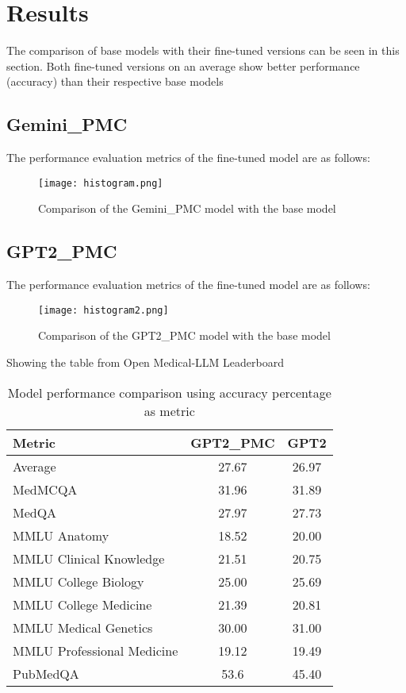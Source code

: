 \chapter{Results}
\label{C4} %
\clearpage
The comparison of base models with their fine-tuned versions can be seen in this section. Both fine-tuned versions on an average show better performance (accuracy) than their respective base models


\section{Gemini\_PMC}
The performance evaluation metrics of the fine-tuned model are as follows:
\begin{figure}[H]
    \centering
\texttt{[image: histogram.png]}
\caption{Comparison of the Gemini\_PMC model with the base model}
\end{figure}

\section{GPT2\_PMC}
The performance evaluation metrics of the fine-tuned model are as follows:
\begin{figure}[H]
    \centering
\texttt{[image: histogram2.png]}
\caption{Comparison of the GPT2\_PMC model with the base model}
\end{figure}
Showing the table from Open Medical-LLM Leaderboard \cite{openllmleaderboard}
\renewcommand{\arraystretch}{1.5}
\begin{table}[H]
    \begin{center}
    \begin{tabular}{|l|c|c|}
    \hline
    \textbf{Metric} & \textbf{GPT2\_PMC} & \textbf{GPT2} \\
    \hline
    Average & 27.67 & 26.97 \\
    \hline
    MedMCQA & 31.96 & 31.89 \\
    \hline
    MedQA & 27.97 & 27.73 \\
    \hline
    MMLU Anatomy & 18.52 & 20.00 \\
    \hline
    MMLU Clinical Knowledge & 21.51 & 20.75 \\
    \hline
    MMLU College Biology & 25.00 & 25.69 \\
    \hline
    MMLU College Medicine & 21.39 & 20.81 \\
    \hline
    MMLU Medical Genetics & 30.00 & 31.00 \\
    \hline
    MMLU Professional Medicine & 19.12 & 19.49 \\
    \hline
    PubMedQA & 53.6 & 45.40 \\
    \hline
    \end{tabular}
    \end{center}
\caption{Model performance comparison using accuracy percentage as metric} 
\end{table}


